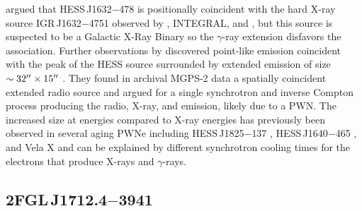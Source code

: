 \cite{aharonian_2006a_h.e.s.s.-survey} argued that
HESS\,J1632$-$478 is positionally coincident with the hard X-ray
source IGR\,J1632$-$4751 observed by \asca, INTEGRAL, and \xmmnewton
\citep{sugizaki_2001a_faint-x-ray,tomsick_2003a_j16320-4751,rodriguez_2003a_xmm-newton-observation},
but this source is suspected to be a Galactic X-Ray Binary so the
$\gamma$-ray extension disfavors the association.  Further observations
by \xmmnewton discovered point-like emission coincident with the
peak of the \ac{HESS} source surrounded by extended emission of size
$\sim32\mbox{$^{\prime\prime}$}\times15\mbox{$^{\prime\prime}$}$ \citep{balbo_2010a_j1632-478:-energetic}.
They found in archival MGPS-2 data a spatially coincident extended
radio source \citep{murphy_2007a_second-epoch} and argued for a
single synchrotron and inverse Compton process producing the radio,
X-ray, and \tev emission, likely due to a PWN.  The increased
size at \tev energies compared to X-ray energies has previously
been observed in several aging PWNe including HESS\,J1825$-$137
\citep{gaensler_2003a_xmm-newton-observations,aharonian_2006a_energy-dependent},
HESS\,J1640$-$465
\citep{aharonian_2006a_h.e.s.s.-survey,funk_2007a_xmm-newton-observations},
and Vela X
\citep{markwardt_1995a_x-ray-pulsar,aharonian_2006a_first-detection}
and can be explained by different synchrotron cooling times for the
electrons that produce X-rays and $\gamma$-rays.

\subsection{2FGL\,J1712.4$-$3941}

